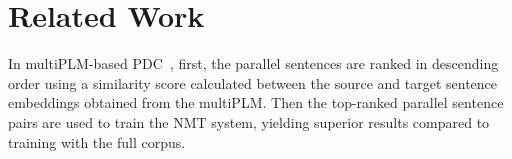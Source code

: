 \section{Related Work}
\label{sec:related_work}




In multiPLM-based PDC~\cite{sloto2023findings,haddad2023proceedings,koehn2020findings}, first, the parallel sentences are ranked in descending order using a similarity score calculated between the source and target sentence embeddings obtained from the multiPLM. Then the top-ranked parallel sentence pairs are used to train the NMT system, yielding superior results compared to training with the full corpus. %



